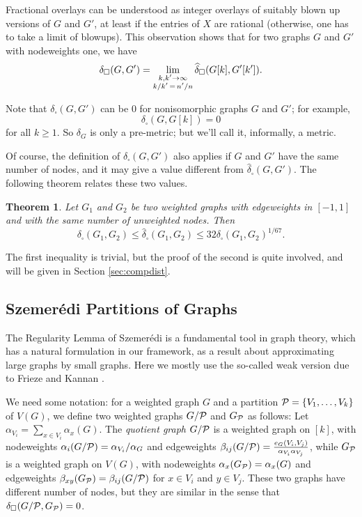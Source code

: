 \documentclass[12pt]{article}
\newtheorem{theorem}{Theorem}[section]
\numberwithin{equation}{section}
\def\bsa{\begin{subarray}{c} }
\def\esa{\end{subarray} }
\def\iv{\widehat}
\def\PP{{\cal P}}\def\QQ{{\cal Q}}\def\RR{{\cal R}}
\begin{document}
Fractional overlays can be understood as integer overlays
of suitably blown up versions of $G$ and $G'$, at least if the
entries of $X$ are rational (otherwise, one has to take a limit of
blowups).  This observation shows that for two graphs $G$ and $G'$
with nodeweights one, we have
\begin{equation}
\label{delta=lim-hat-delta}
\delta_\square(G,G')
=\lim_{\bsa k,k'\to\infty\\ k/k'\,=\,n'/n\esa}
\iv\delta_\square(G[k],G'[k']).
\end{equation}

Note that $\delta_\square(G,G')$ can be $0$ for nonisomorphic graphs $G$
and $G'$; for example,
\begin{equation}\label{BLOW-DIST}
\delta_\square(G,G[k])=0
\end{equation}
for all $k\ge 1$. So $\delta_G$ is only a pre-metric; but we'll
call it, informally, a metric.

Of course, the definition of $\delta_\square(G,G')$ also applies if
$G$ and $G'$ have the same number of nodes, and it may give a value
different from $\iv\delta_\square(G,G')$. The following theorem
relates these two values.

\begin{theorem}\label{TWIN-SQUARE}
Let  $G_1$ and $G_2$ be two weighted graphs with edgeweights in
$[-1,1]$ and with the same number of unweighted nodes. Then
\[
\delta_\square(G_1,G_2)\le\iv\delta_\square(G_1,G_2)\le
{32}\delta_\square(G_1,G_2)^{{1/67}}.
\]
\end{theorem}


The first inequality is trivial, but the proof of the second is
quite involved, and will be given in Section \ref{sec:compdist}.

\subsection{Szemer\'edi Partitions of Graphs}
\label{sec:Graph-Szemeredi}


The Regularity Lemma of Szemer\'edi is a fundamental tool in graph
theory, which has a natural formulation in our framework,
as a result about approximating large graphs by small graphs.
Here we mostly use the so-called weak version due to Frieze and
Kannan \cite{FK}.

We need some notation: for a weighted graph $G$ and a partition
$\PP=\{V_1,\dots,V_k\}$ of $V(G)$, we define two weighted graphs
$G/\PP$ and $G_\PP$ as follows: Let $\alpha_{V_i}=\sum_{x\in
V_i}\alpha_x(G)$. The {\it quotient graph} $G/\PP$ is a weighted
graph on $[k]$, with nodeweights
$\alpha_i(G/\PP)=\alpha_{V_i}/\alpha_G$ and edgeweights
$\beta_{ij}(G/\PP) =\frac{e_G(V_i,V_j)}{\alpha_{V_i}\alpha_{V_j}}$,
while $G_\PP$ is a weighted graph on $V(G)$, with nodeweights
$\alpha_x(G_\PP)=\alpha_x(G)$ and edgeweights $\beta_{xy}(G_\PP)=
\beta_{ij}(G/\PP)$ for $x\in V_i$ and $y\in V_j$. These two graphs
have different number of nodes, but they are similar in the sense
that $\delta_\square(G/\PP,G_\PP)=0$.
\end{document}
